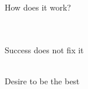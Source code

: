 \documentclass[aspectratio=169]{beamer}
\begin{document}
\begin{frame}
  \begin{center}
    \Huge How does it work?
    \small
    \\ \small \cite{hh15}
    \\ \small \cite{langford93}
    \\ \small \cite{colour}
  \end{center}
\end{frame}

\begin{frame}
  \begin{center}
    \Huge Success does not fix it
    \\ \small \cite{clanceimes78}
    \\ \small \cite{sakulku11}
  \end{center}
\end{frame}

\begin{frame}
  \begin{center}
    \Huge Desire to be the best
    \small
    \\ \small \cite{sakulku11}
  \end{center}
\end{frame}
\end{document}
